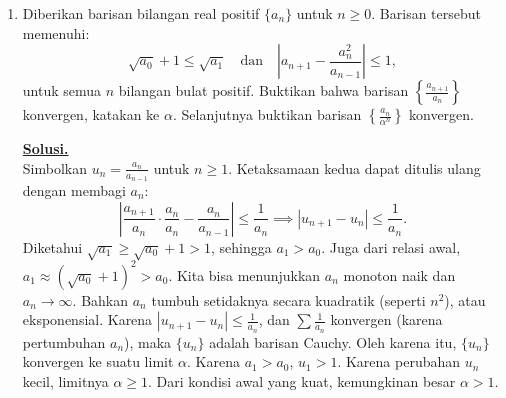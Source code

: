 \documentclass[12pt,twoside]{article}
\newenvironment{solution}
{
	\par\noindent\textbf{\underline{Solusi.}}\\
}
{
	\par
}
\begin{document}
\begin{enumerate}
\begin{solution}
          Berdasarkan Teorema Rank-Nullity, $\dim(\text{Null } B) = n - \text{Rank}(B) = n - (n-k) = k$.
          Karena kita sudah menemukan $k$ vektor bebas linier di Null($B$), maka himpunan $\{\mathbf{v}_1, \dots, \mathbf{v}_k\}$ adalah basis.
          Basis ruang nol $B$ adalah:
          \[ \left\{ \begin{pmatrix} -\mathbf{b}_1 \\ \mathbf{e}_1 \end{pmatrix}, \begin{pmatrix} -\mathbf{b}_2 \\ \mathbf{e}_2 \end{pmatrix}, \dots, \begin{pmatrix} -\mathbf{b}_k \\ \mathbf{e}_k \end{pmatrix} \right\}. \]
        \end{solution}

  \item Diberikan barisan bilangan real positif $\{a_n\}$ untuk $n \geq 0$. Barisan tersebut memenuhi:
        \[
          \sqrt{a_0} + 1 \leq \sqrt{a_1} \quad \text{dan} \quad \left| a_{n+1} - \frac{a_n^2}{a_{n-1}} \right| \leq 1,
        \]
        untuk semua $n$ bilangan bulat positif. Buktikan bahwa barisan $\left\{ \frac{a_{n+1}}{a_n} \right\}$ konvergen, katakan ke $\alpha$. Selanjutnya buktikan barisan $\left\{ \frac{a_n}{\alpha^n}\right\}$ konvergen.

        \begin{solution}
          Simbolkan $u_n = \frac{a_n}{a_{n-1}}$ untuk $n \ge 1$.
          Ketaksamaan kedua dapat ditulis ulang dengan membagi $a_n$:
          \[ \left| \frac{a_{n+1}}{a_n} \cdot \frac{a_n}{a_n} - \frac{a_n}{a_{n-1}} \right| \leq \frac{1}{a_n} \implies |u_{n+1} - u_n| \leq \frac{1}{a_n}. \]
          Diketahui $\sqrt{a_1} \ge \sqrt{a_0} + 1 > 1$, sehingga $a_1 > a_0$.
          Juga dari relasi awal, $a_1 \approx (\sqrt{a_0}+1)^2 > a_0$.
          Kita bisa menunjukkan $a_n$ monoton naik dan $a_n \to \infty$. Bahkan $a_n$ tumbuh setidaknya secara kuadratik (seperti $n^2$), atau eksponensial.
          Karena $|u_{n+1} - u_n| \le \frac{1}{a_n}$, dan $\sum \frac{1}{a_n}$ konvergen (karena pertumbuhan $a_n$), maka $\{u_n\}$ adalah barisan Cauchy.
          Oleh karena itu, $\{u_n\}$ konvergen ke suatu limit $\alpha$.
          Karena $a_1 > a_0$, $u_1 > 1$. Karena perubahan $u_n$ kecil, limitnya $\alpha \ge 1$.
          Dari kondisi awal yang kuat, kemungkinan besar $\alpha > 1$.


\end{solution}
\end{enumerate}
\end{document}

